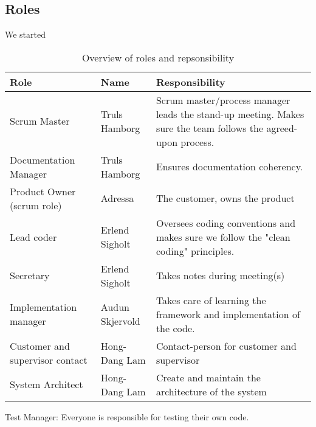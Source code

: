 \subsection{Roles}
We started 

\begin{table}[H]
  \begin{tabular}{|ll p{5cm}|}
    \hline
    Role & Name & Responsibility \\ \hline 
    Scrum Master & Truls Hamborg &  Scrum master/process manager leads the stand-up meeting. Makes sure the team follows the agreed-upon process. \\ \hline
    Documentation Manager & Truls Hamborg &  Ensures documentation coherency. \\ \hline
    Product Owner (scrum role) & Adressa & The customer, owns the product\\ \hline
    Lead coder & Erlend Sigholt & Oversees coding conventions and makes sure we follow the "clean coding" principles. \\ \hline
    Secretary & Erlend Sigholt & Takes notes during meeting(s) \\ \hline
    Implementation manager & Audun Skjervold & Takes care of learning the framework and implementation of the code.\\ \hline
    Customer and supervisor contact & Hong-Dang Lam & Contact-person for customer and supervisor \\ \hline
    System Architect & Hong-Dang Lam & Create and maintain the architecture of the system \\
    \hline
  \end{tabular}
  \caption{Overview of roles and repsonsibility}
  \end{table}
Test Manager: Everyone is responsible for testing their own code.